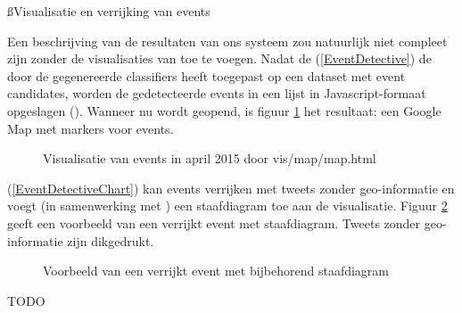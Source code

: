 {{\ss{Visualisatie en verrijking van events}

Een beschrijving van de resultaten van ons systeem zou natuurlijk niet compleet zijn zonder de visualisaties van  toe te 
voegen. Nadat de  (\ref{EventDetective}) de door de  gegenereerde classifiers heeft 
toegepast op een dataset met event candidates, worden de gedetecteerde events in een lijst in Javascript-formaat 
opgeslagen (). Wanneer nu  wordt geopend, is figuur \ref{standaardvis} het resultaat: een Google Map met
markers voor events.

\begin{figure}[H]
  \centering
    \caption{Visualisatie van events in april 2015 door vis/map/map.html}
  \label{standaardvis}
\end{figure}

 (\ref{EventDetectiveChart}) kan events verrijken met tweets zonder geo-informatie en voegt (in samenwerking
met ) een staafdiagram toe aan de visualisatie. Figuur \ref{verrijk} geeft een voorbeeld van een verrijkt event met staafdiagram.
Tweets zonder geo-informatie zijn dikgedrukt.

\begin{figure}[H]
  \centering
    \caption{Voorbeeld van een verrijkt event met bijbehorend staafdiagram}
  \label{verrijk}
\end{figure}


TODO

\newpage
{}\label{bijlage}

\captionsetup{hypcap=false}

}}
